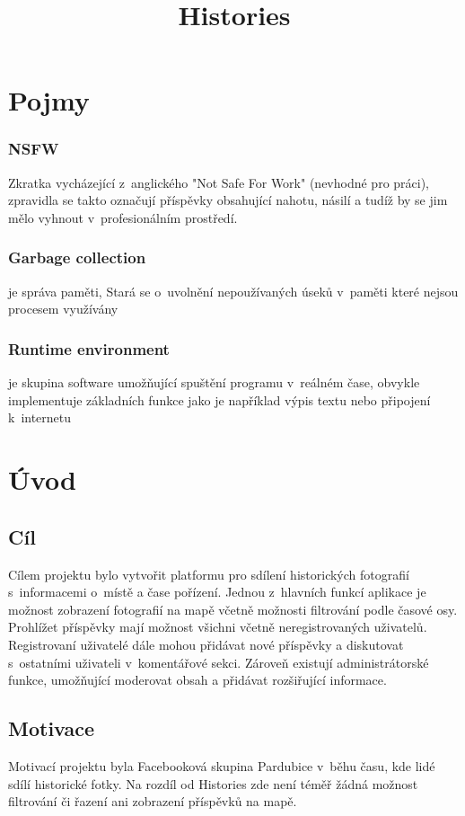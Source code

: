 \documentclass[12pt, a4paper,
  oneside,      %
]{report}
\title{Histories} %
\author{\name} %
\date{\publicationYear} %
\begin{document}
\pagestyle{empty}



\chapter{Pojmy}
\subsection{NSFW}
Zkratka vycházející z~anglického "Not Safe For Work" (nevhodné pro práci), zpravidla se takto označují příspěvky obsahující nahotu, násilí a tudíž by se jim mělo vyhnout v~profesionálním prostředí. \cite{NSFW}

\subsection{Garbage collection} je správa paměti, Stará se o~uvolnění nepoužívaných úseků v~paměti které nejsou procesem využívány \cite{GarbageCollection}

\subsection{Runtime environment} je skupina software umožňující spuštění programu v~reálném čase, obvykle implementuje základních funkce jako je například výpis textu nebo připojení k~internetu \cite{whatIsRuntimeEnvironment}


\chapter{Úvod}
\section{Cíl}
Cílem projektu bylo vytvořit platformu pro sdílení historických fotografií
s~informacemi o~místě a čase pořízení. Jednou z~hlavních funkcí aplikace je možnost
zobrazení fotografií na mapě včetně možnosti filtrování podle časové osy. Prohlížet příspěvky mají možnost všichni včetně neregistrovaných uživatelů. Registrovaní uživatelé dále mohou přidávat nové příspěvky a diskutovat s~ostatními uživateli
v~komentářové sekci. Zároveň existují administrátorské funkce, umožňující moderovat obsah a přidávat rozšiřující informace.

\section{Motivace}
Motivací projektu byla Facebooková skupina Pardubice v~běhu času\cite{PardubiceVBehuCasuFB}, kde lidé
sdílí historické fotky. Na rozdíl od Histories zde není téměř žádná možnost filtrování či
řazení ani zobrazení příspěvků na mapě.
\end{document}
